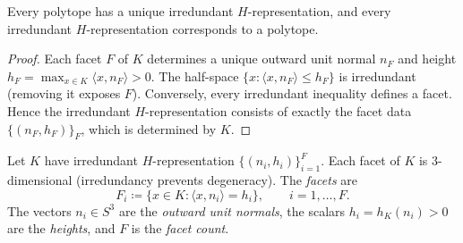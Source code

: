 \begin{lemma}\label{lem:h-rep-unique}
Every polytope has a unique irredundant $H$-representation,
and every irredundant $H$-representation corresponds to a polytope.
\end{lemma}

\begin{proof}
Each facet $F$ of $K$ determines a unique outward unit normal $n_F$
and height $h_F = \max_{x \in K} \langle x, n_F \rangle > 0$.
The half-space $\{x : \langle x, n_F \rangle \leq h_F\}$ is irredundant
(removing it exposes $F$).
Conversely, every irredundant inequality defines a facet.
Hence the irredundant $H$-representation consists of exactly the
facet data $\{(n_F, h_F)\}_F$, which is determined by $K$.
\end{proof}

\begin{definition}\label{def:facets}
Let $K$ have irredundant $H$-representation
$\{(n_i, h_i)\}_{i=1}^{F}$.
Each facet of $K$ is $3$-dimensional (irredundancy prevents degeneracy).
The \emph{facets} are
\[
  F_i \coloneqq \{ x \in K : \langle x, n_i \rangle = h_i \},
  \qquad i = 1, \ldots, F.
\]
The vectors $n_i \in S^3$ are the \emph{outward unit normals},
the scalars $h_i = h_K(n_i) > 0$ are the \emph{heights},
and $F$ is the \emph{facet count}.
\end{definition}

